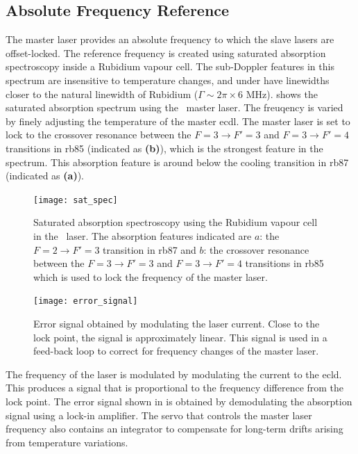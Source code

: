 \subsection{Absolute Frequency Reference}\label{subsec:muquans_master}
The master laser provides an absolute frequency to which the slave
lasers are offset-locked. The reference frequency is created using 
saturated absorption spectroscopy inside a Rubidium vapour cell. The sub-Doppler
features in this spectrum are insensitive to temperature changes, and under
have linewidths closer to the natural linewidth of
Rubidium (\(\Gamma \sim 2\pi \times 6\) MHz). 
shows the saturated absorption spectrum using the \Muquans\ master laser. The freuqency is varied
by finely adjusting the temperature of the master \ac{ecdl}. The
master laser is set to lock to the crossover resonance between the \(F = 3
\rightarrow F' = 3\) and \(F = 3 \rightarrow F' = 4 \) transitions in \ac{rb85}
(indicated as \textbf{(b)}), which is the strongest feature in the spectrum. This
absorption feature is around  below the cooling
transition in \ac{rb87} (indicated as \textbf{(a)}).
\begin{figure}[!htbp]
	\texttt{[image: sat\_spec]}
	\caption[Saturated absorption spectroscopy of the \\Muquans\ master laser.]{Saturated absorption spectroscopy using the Rubidium vapour cell in the \Muquans\ laser. The absorption features indicated are \(a\): the \(F = 2 \rightarrow F' = 3\) transition in \ac{rb87} and \(b\): the crossover resonance between the \(F = 3 \rightarrow F' = 3\) and \(F = 3 \rightarrow F' = 4 \) transitions in \ac{rb85} which is used to lock the frequency of the master laser.}\label{fig:muquans_satspec}
\end{figure}
\begin{figure}[!htbp]
	\texttt{[image: error\_signal]}
	\caption[Error Signal for the \Muquans\ master servo.]{Error signal obtained by modulating the laser current. Close to the lock point, the signal is approximately linear. This signal is used in a feed-back loop to correct for frequency changes of the master laser.}\label{fig:muquans_error_signal}
\end{figure}
The frequency of the laser is modulated by modulating the current to the \ac{ecld}. This produces a signal that is
proportional to the frequency difference from the lock point. The error signal shown in
 is obtained by demodulating the absorption
signal using a lock-in amplifier. The servo that controls the master laser frequency also contains
an integrator to compensate for long-term drifts arising from temperature
variations.
